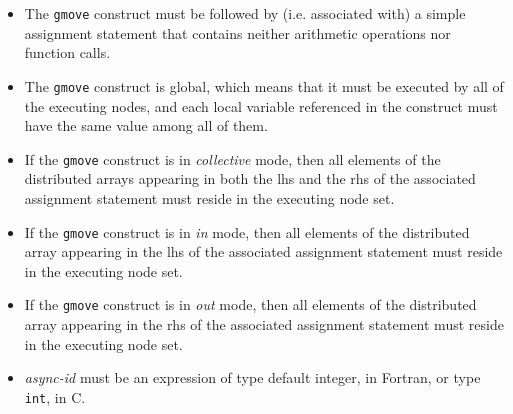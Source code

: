 \begin{itemize}
 \item The {\tt gmove} construct must be followed by (i.e. associated
       with) a simple assignment statement that contains neither
       arithmetic operations nor function calls.
 \item The {\tt gmove} construct is global, which means that it must be
       executed by all of the executing nodes, and each local variable
       referenced in the construct must have the same value among all of
       them.
 \item If the {\tt gmove} construct is in {\it collective} mode, then
       all elements of the distributed arrays appearing in both the
       lhs and the rhs of the associated assignment
       statement must reside in the executing node set.
 \item If the {\tt gmove} construct is in {\it in} mode, then
       all elements of the distributed array appearing in the lhs of the
       associated assignment statement must reside in the executing node
       set.
 \item If the {\tt gmove} construct is in {\it out} mode, then
       all elements of the distributed array appearing in the rhs of the
       associated assignment statement must reside in the executing node
       set.
 \item {\it async-id} must be an expression of type default integer, in
       Fortran, or type {\tt int}, in C.
\end{itemize}

